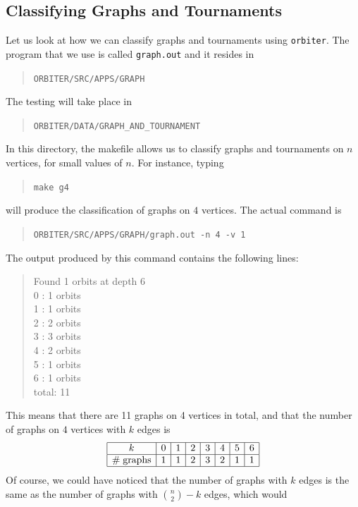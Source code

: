 \subsection{Classifying Graphs and Tournaments}
\label{sec:graphsandtournaments}

Let us look at how we can classify graphs and tournaments using \verb'orbiter'.
The program that we use is called \verb'graph.out' and it resides in 
\begin{quote}
\verb'ORBITER/SRC/APPS/GRAPH'\\
\end{quote}
The testing will take place in 
\begin{quote}
\verb'ORBITER/DATA/GRAPH_AND_TOURNAMENT'\\
\end{quote}
In this directory, the makefile allows us to classify graphs and tournaments 
on $n$ vertices, for small values of $n$. 
For instance, typing 
\begin{quote}
\verb'make g4'\\
\end{quote}
will produce the classification of graphs on $4$ vertices. 
The actual command is 
\begin{quote}
\verb'ORBITER/SRC/APPS/GRAPH/graph.out -n 4 -v 1'\\
\end{quote}
The output produced by this command contains the following lines:
\begin{quote}
Found 1 orbits at depth 6\\
0 : 1 orbits\\
1 : 1 orbits\\
2 : 2 orbits\\
3 : 3 orbits\\
4 : 2 orbits\\
5 : 1 orbits\\
6 : 1 orbits\\
total: 11\\
\end{quote}
This means that there are 11 graphs on 4 vertices in total, 
and that the number of graphs on $4$ vertices with $k$ edges is 
$$
\begin{array}{|c|*{7}{c|}}
\hline
k & 0 & 1 & 2 & 3 & 4 & 5 & 6 \\
\hline
\# \; \mbox{graphs} & 1 & 1 & 2 & 3 & 2 & 1 & 1 \\
\hline
\end{array}
$$
Of course, we could have noticed that the number of graphs with $k$ edges is the same as the number of graphs with ${n \choose 2} - k$ edges, which would 
